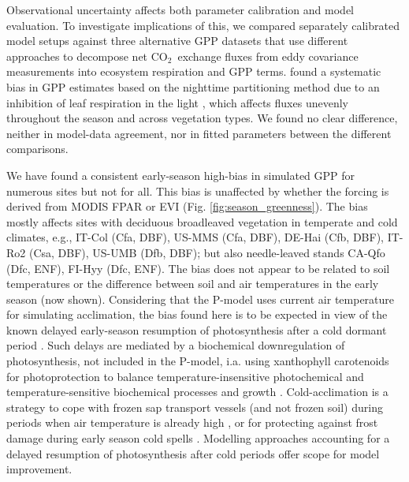 \documentclass{myreport}
\newcommand{\coo}{CO$_2$}
\begin{document}
Observational uncertainty affects both parameter calibration and model evaluation. To investigate implications of this, we compared separately calibrated model setups against three alternative GPP datasets that use different approaches to decompose net \coo\ exchange fluxes from eddy covariance measurements into ecosystem respiration and GPP terms. \citet{keenan19natee} found a systematic bias in GPP estimates based on the nighttime partitioning method due to an inhibition of leaf respiration in the light \citep{kok49, wehr16}, which affects fluxes unevenly throughout the season and across vegetation types. We found no clear difference, neither in model-data agreement, nor in fitted parameters between the different comparisons.

We have found a consistent early-season high-bias in simulated GPP for numerous sites but not for all. This bias is unaffected by whether the forcing is derived from MODIS FPAR or EVI (Fig. \ref{fig:season_greenness}). The bias mostly affects sites with deciduous broadleaved vegetation in temperate and cold climates, e.g., IT-Col (Cfa, DBF), US-MMS (Cfa, DBF), DE-Hai (Cfb, DBF), IT-Ro2 (Csa, DBF), US-UMB (Dfb, DBF); but also needle-leaved stands CA-Qfo (Dfc, ENF), FI-Hyy (Dfc, ENF). The bias does not appear to be related to soil temperatures or the difference between soil and air temperatures in the early season (now shown). Considering that the P-model uses current air temperature for simulating acclimation, the bias found here is to be expected in view of the known delayed early-season resumption of photosynthesis after a cold dormant period \citep{huner93, oquist03, adams04, verhoeven14, bowling18}. Such delays are mediated by a biochemical downregulation of photosynthesis, not included in the P-model, i.a. using xanthophyll carotenoids for photoprotection \citep{adams04} to balance temperature-insensitive photochemical and temperature-sensitive biochemical processes and growth \citep{oquist03}. Cold-acclimation is a strategy to cope with frozen sap transport vessels (and not frozen soil) during periods when air temperature is already high \citep{bowling18}, or for protecting against frost damage during early season cold spells \citep{vitasse14}. Modelling approaches accounting for a delayed resumption of photosynthesis after cold periods  \citet{pelkonen80, bergh98, makela04} offer scope for model improvement.
\end{document}
